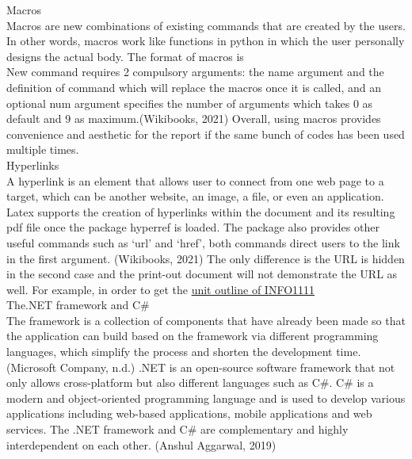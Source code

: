 \documentclass[a4paper, 11pt]{report}
\begin{document}
\noindent Macros\\
\noindent Macros are new combinations of existing commands that are created by the users.  In other words, macros work like functions in python in which the user personally designs the actual body. The format of macros is \\

\noindent New command requires 2 compulsory arguments: the name argument and the definition of command which will replace the macros once it is called, and an optional num argument specifies the number of arguments which takes 0 as default and 9 as maximum.(Wikibooks, 2021) Overall, using macros provides convenience and aesthetic for the report if the same bunch of codes has been used multiple times.\\

\noindent Hyperlinks\\
\noindent A hyperlink is an element that allows user to connect from one web page to a target, which can be another website, an image, a file, or even an application. Latex supports the creation of hyperlinks within the document and its resulting pdf file once the package hyperref is loaded. The package also provides other useful commands such as ‘url’ and ‘href’, both commands direct users to the link in the first argument. (Wikibooks, 2021) The only difference is the URL is hidden in the second case and the print-out document will not demonstrate the URL as well. For example, in order to get the \href{https://www.sydney.edu.au/units/INFO1111/2022-S1C-ND-CC}{unit outline of INFO1111}\\

\noindent The.NET framework and C\#\\
\noindent The framework is a collection of components that have already been made so that the application can build based on the framework via different programming languages, which simplify the process and shorten the development time. (Microsoft Company, n.d.)  .NET is an open-source software framework that not only allows cross-platform but also different languages such as C\#. C\# is a modern and object-oriented programming language and is used to develop various applications including web-based applications, mobile applications and web services. The .NET framework and C\# are complementary and highly interdependent on each other. (Anshul Aggarwal, 2019)\\ 
\end{document}
